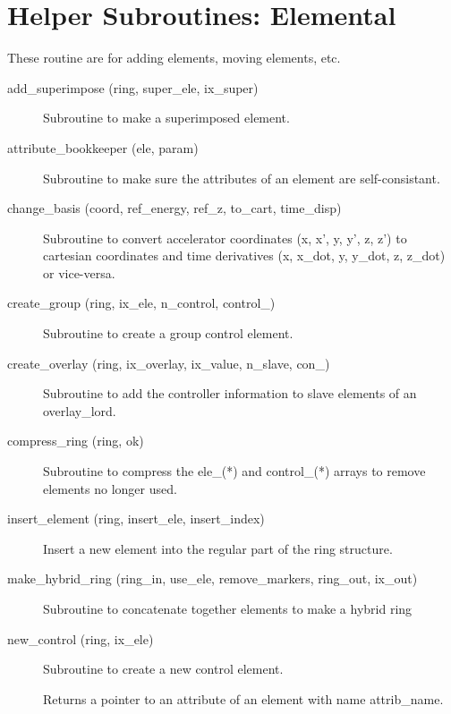 \section{Helper Subroutines: Elemental}
\label{r:elem}     

These routine are for adding elements, moving elements, etc.

\begin{description}

\item[add\_superimpose (ring, super\_ele, ix\_super)] \Newline
Subroutine to make a superimposed element. 

\item[attribute\_bookkeeper (ele, param)] \Newline
Subroutine to make sure the attributes of an element are self-consistant. 

\item[change\_basis (coord, ref\_energy, ref\_z, to\_cart, time\_disp)] \Newline
Subroutine to convert accelerator coordinates (x, x', y, y', z, z') to 
cartesian coordinates and time derivatives (x, x\_dot, y, y\_dot, z, z\_dot) or vice-versa. 

\item[create\_group (ring, ix\_ele, n\_control, control\_)] \Newline
Subroutine to create a group control element. 

\item[create\_overlay (ring, ix\_overlay, ix\_value, n\_slave, con\_)] \Newline
Subroutine to add the controller information to slave elements of an overlay\_lord. 

\item[compress\_ring (ring, ok)] \Newline
Subroutine to compress the ele\_(*) and control\_(*) arrays to remove elements no longer used. 

\item[insert\_element (ring, insert\_ele, insert\_index)] \Newline
Insert a new element into the regular part of the ring structure. 

\item[make\_hybrid\_ring (ring\_in, use\_ele, remove\_markers, ring\_out, ix\_out)] \Newline
Subroutine to concatenate together elements to make a hybrid ring 

\item[new\_control (ring, ix\_ele)] \Newline
Subroutine to create a new control element. 

\item[\protect\parbox{6in}{pointer\_to\_attribute (ele, attrib\_name, do\_allocation, 
\\ \hspace*{2in} ptr\_attrib, ix\_attrib, err\_flag, err\_print\_flag)}] \Newline
Returns a pointer to an attribute of an element with name attrib\_name. 


\end{description}
